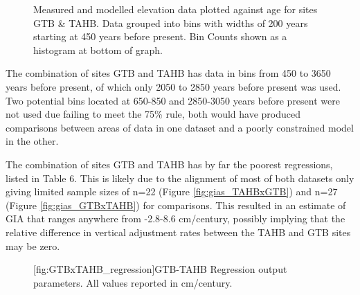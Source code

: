 \begin{figure}[H]
	\caption{Measured and modelled elevation data plotted against age for sites GTB \& TAHB. Data grouped into bins with widths of 200 years starting at 450 years before present. Bin Counts shown as a histogram at bottom of graph.}	
	\label{fig:data_GTBxTAHB}
\end{figure}
The combination of sites GTB and TAHB has data in bins from 450 to 3650 years before
present, of which only 2050 to 2850 years before present was used. Two
potential bins located at 650-850 and 2850-3050 years before present were not used due failing to
meet the 75\% rule, both would have produced comparisons between areas of
data in one dataset and a poorly constrained model in the other.

The combination of sites GTB and TAHB has by far the poorest regressions, listed
in Table 6. This is likely due to the alignment of most
of both datasets only giving limited sample sizes of n=22 (Figure \ref{fig:gias_TAHBxGTB})
and n=27 (Figure \ref{fig:gias_GTBxTAHB}) for comparisons. 
This resulted in an estimate of GIA that ranges anywhere from -2.8-8.6 cm/century,
possibly implying that the relative difference in vertical adjustment rates
between the TAHB and GTB sites may be zero. \\

\begin{figure}[H]
	\begin{flushleft}
	
	[fig:GTBxTAHB_regression]{GTB-TAHB Regression output parameters. All values reported in cm/century.}
	
	\end{flushleft}
\end{figure}

